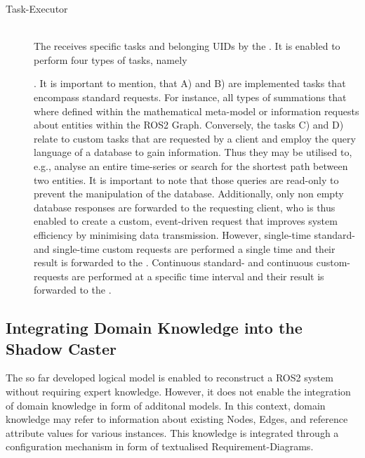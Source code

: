 \begin{description}
        \item[Task-Executor] \hfill \\
        The  receives specific tasks and belonging UIDs by the . It is enabled to perform four types of tasks, namely
        . It is important to mention, that A) and B) are implemented tasks that encompass standard requests. For instance, all types of summations that where defined within the mathematical meta-model or information requests about entities within the ROS2 Graph. Conversely, the tasks C) and D) relate to custom tasks that are requested by a client and employ the query language of a database to gain information. Thus they may be utilised to, e.g., analyse an entire time-series or search for the shortest path between two entities. It is important to note that those queries are read-only to prevent the manipulation of the database. Additionally, only non empty database responses are forwarded to the requesting client, who is thus enabled to create a custom, event-driven request that improves system efficiency by minimising data transmission.\newline
        However, single-time standard- and single-time custom requests are performed a single time and their result is forwarded to the .\newline
        Continuous standard- and continuous custom-requests are performed at a specific time interval and their result is forwarded to the .
\end{description}

        \subsection*{Integrating Domain Knowledge into the Shadow Caster}
        The so far developed logical model is enabled to reconstruct a ROS2 system without requiring expert knowledge. However, it does not enable the integration of domain knowledge in form of additonal models. In this context, domain knowledge may refer to information about existing Nodes, Edges, and reference attribute values for various instances. This knowledge is integrated through a configuration mechanism in form of textualised Requirement-Diagrams.

